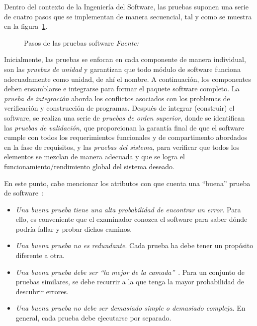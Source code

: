 Dentro del contexto de la Ingeniería del Software, las pruebas suponen una serie de cuatro pasos que se implementan de manera secuencial, tal y como se muestra en la figura~\ref{fig:estrategiaPruebas}. 

\begin{figure}
	\centering
	\caption[Pasos de las pruebas software]{Pasos de las pruebas software \textit{Fuente:~\cite{Pre10}}}
	\label{fig:estrategiaPruebas}
\end{figure}

Inicialmente, las pruebas se enfocan en cada componente de manera individual, son las \emph{pruebas de unidad} y garantizan que todo módulo de software funciona adecuadamente como unidad, de ahí el nombre. A continuación, los componentes deben ensamblarse e integrarse para formar el paquete software completo. La \emph{prueba de integración} aborda los conflictos asociados con los problemas de verificación y construcción de programas. Después de integrar (construir) el software, se realiza una serie de \emph{pruebas de orden superior}, donde se identifican las \emph{pruebas de validación}, que proporcionan la garantía final de que el software cumple con todos los requerimientos funcionales y de compartimento abordados en la fase de requisitos, y las \emph{pruebas del sistema}, para verificar que todos los elementos se mezclan de manera adecuada y que se logra el funcionamiento/rendimiento global del sistema deseado.

En este punto, cabe mencionar los atributos con que cuenta una ``buena'' prueba de software~\cite{Kan99}:

\begin{itemize}
	\item \textit{Una buena prueba tiene una alta probabilidad de encontrar un error}. Para ello, es conveniente que el examinador conozca el software para saber dónde podría fallar y probar dichos caminos.
	\item \textit{Una buena prueba no es redundante}. Cada prueba ha debe tener un propósito diferente a otra.
	\item \textit{Una buena prueba debe ser ``la mejor de la camada''}~\cite{Kan99}. Para un conjunto de pruebas similares, se debe recurrir a la que tenga la mayor probabilidad de descubrir errores.
	\item \textit{Una buena prueba no debe ser demasiado simple o demasiado compleja}. En general, cada prueba debe ejecutarse por separado.
\end{itemize}

